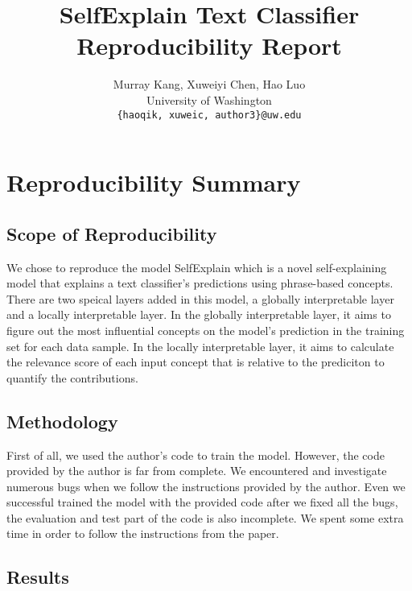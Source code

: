 \documentclass{article}
\title{SelfExplain Text Classifier Reproducibility Report}
\author{%
  Murray Kang,  Xuweiyi Chen,  Hao Luo \\ %
  University of Washington \\
 \texttt{\{haoqik, xuweic, author3\}@uw.edu} \\ %
}
\begin{document}
\maketitle



\section*{\centering Reproducibility Summary}


\subsection*{Scope of Reproducibility}

We chose to reproduce the model SelfExplain which is a novel self-explaining model that explains a text classifier's predictions using phrase-based concepts. There are two speical layers added in this model, a globally interpretable layer and a locally interpretable layer. In the globally interpretable layer, it aims to figure out the most influential concepts on the model's prediction in the training set for each data sample. In the locally interpretable layer, it aims to calculate the relevance score of each input concept that is relative to the prediciton to quantify the contributions.

\subsection*{Methodology}

First of all, we used the author's code to train the model. However, the code provided by 
the author is far from complete. We encountered and investigate numerous bugs when we follow
the instructions provided by the author. Even we successful trained the model with the provided 
code after we fixed all the bugs, the evaluation and test part of the code is also incomplete. 
We spent some extra time in order to follow the instructions from the paper.

\subsection*{Results}
\end{document}
